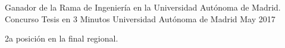 \begin{cventries}
  \cventry
    {Ganador de la Rama de Ingeniería en la Universidad Autónoma de Madrid.} %
    {Concurso Tesis en 3 Minutos} %
    {Universidad Autónoma de Madrid} %
    {May 2017} %
    {
      \begin{cvitems} %
        \item {2a posición en la final regional.}
      \end{cvitems}
    }
\end{cventries}